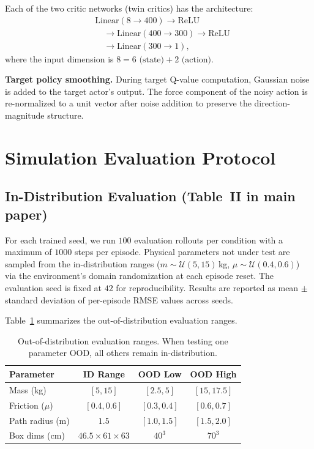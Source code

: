 Each of the two critic networks (twin critics) has the architecture:
%
\begin{align*}
    &\mathrm{Linear}(8 \to 400) \to \mathrm{ReLU} \\
    &\quad\to \mathrm{Linear}(400 \to 300) \to \mathrm{ReLU} \\
    &\quad\to \mathrm{Linear}(300 \to 1),
\end{align*}
%
where the input dimension is $8 = 6\text{ (state)} + 2\text{ (action)}$.

\noindent\textbf{Target policy smoothing.}
During target Q-value computation, Gaussian noise is added to the target actor's output.
The force component of the noisy action is re-normalized to a unit vector after noise addition to preserve the direction-magnitude structure.


\section{Simulation Evaluation Protocol}\label{app:eval}

\subsection{In-Distribution Evaluation (Table~II in main paper)}

For each trained seed, we run $100$ evaluation rollouts per condition with a maximum of $1000$ steps per episode.
Physical parameters not under test are sampled from the in-distribution ranges ($m \sim \mathcal{U}(5, 15)$\,kg, $\mu \sim \mathcal{U}(0.4, 0.6)$) via the environment's domain randomization at each episode reset.
The evaluation seed is fixed at $42$ for reproducibility.
Results are reported as mean $\pm$ standard deviation of per-episode RMSE values across seeds.

Table~\ref{tab:ood_ranges} summarizes the out-of-distribution evaluation ranges.

\begin{table}[h]
\centering
\caption{Out-of-distribution evaluation ranges. When testing one parameter OOD, all others remain in-distribution.}
\label{tab:ood_ranges}
\begin{tabular}{lccc}
\toprule
\textbf{Parameter} & \textbf{ID Range} & \textbf{OOD Low} & \textbf{OOD High} \\
\midrule
Mass (kg)           & $[5, 15]$       & $[2.5, 5]$     & $[15, 17.5]$    \\
Friction ($\mu$)    & $[0.4, 0.6]$    & $[0.3, 0.4]$   & $[0.6, 0.7]$    \\
Path radius (m)     & $1.5$           & $[1.0, 1.5]$   & $[1.5, 2.0]$    \\
Box dims (cm)       & $46.5 \times 61 \times 63$ & $40^3$ & $70^3$     \\
\bottomrule
\end{tabular}
\end{table}


